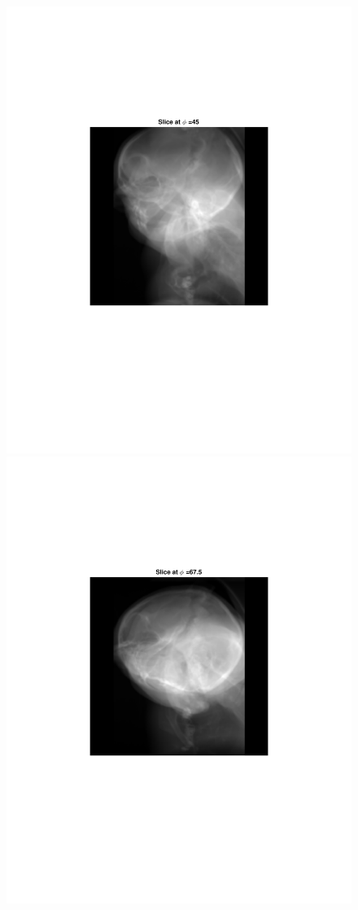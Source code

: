 \documentclass{UCF_ETD}
\begin{document}
\begin{figure}[H]
\begin{center}
\includegraphics[scale=0.5]{FVR/CompSlice45} 
\includegraphics[scale=0.5]{FVR/CompSlice68}

\end{center}
\end{figure}
\end{document}

